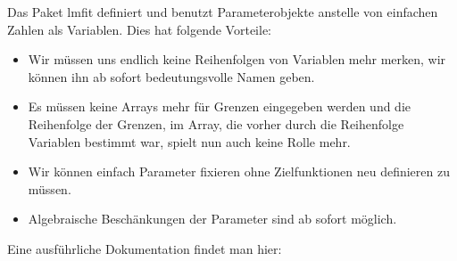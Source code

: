 \documentclass[letterpaper,10pt,english]{jupyterBook}
\begin{document}
\sphinxAtStartPar
Das Paket lmfit definiert und benutzt Parameterobjekte anstelle von einfachen Zahlen als Variablen. Dies hat folgende Vorteile:
\begin{itemize}
\item {} 
\sphinxAtStartPar
Wir müssen uns endlich keine Reihenfolgen von Variablen mehr merken, wir können ihn ab sofort bedeutungsvolle Namen geben.

\item {} 
\sphinxAtStartPar
Es müssen keine Arrays mehr für Grenzen eingegeben werden und die Reihenfolge der Grenzen, im Array, die vorher durch die Reihenfolge Variablen bestimmt war, spielt nun auch keine Rolle mehr.

\item {} 
\sphinxAtStartPar
Wir können einfach Parameter fixieren ohne Zielfunktionen neu definieren zu müssen.

\item {} 
\sphinxAtStartPar
Algebraische Beschänkungen der Parameter sind ab sofort möglich.

\end{itemize}

\sphinxAtStartPar
Eine ausführliche Dokumentation findet man hier: 
\end{document}
